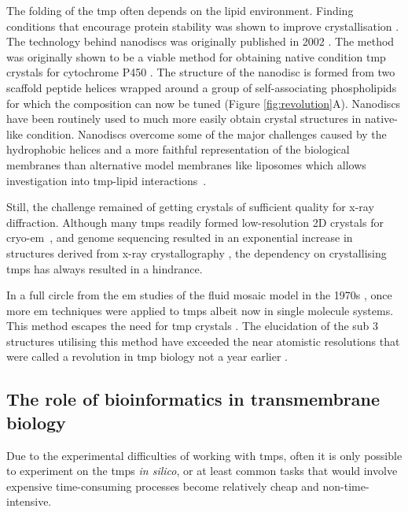 The folding of the \gls{tmp} often depends on the lipid environment.
Finding conditions that encourage protein stability was shown to improve crystallisation \cite{Carpenter2008, Rosenbusch2001}.
The technology behind nanodiscs was originally published in 2002 \cite{Bayburt2002}.
The method was originally shown to be a viable method for obtaining native condition \gls{tmp} crystals for cytochrome P450 \cite{Duan2004}.
The structure of the nanodisc is formed from two scaffold peptide helices wrapped around a group of self\--associating phospholipids for which the composition can now be tuned \cite{Schuler2013} (Figure \ref{fig:revolution}A).
Nanodiscs have been routinely used to much more easily obtain crystal structures in native\--like condition.
Nanodiscs overcome some of the major challenges caused by the hydrophobic helices and a more faithful representation of the biological membranes than alternative model membranes like liposomes which allows investigation into \gls{tmp}\--lipid interactions~\cite{Borch2009}.

Still, the challenge remained of getting crystals of sufficient quality for x\--ray diffraction.
Although many \gls{tmp}s readily formed low\--resolution 2D crystals for cryo\--\gls{em}~\cite{Vinothkumar2015, Raunser2009}, and genome sequencing resulted in an exponential increase in structures derived from x\--ray crystallography \cite{Vinothkumar2010}, the dependency on crystallising \gls{tmp}s has always resulted in a hindrance.

In a full circle from the \gls{em} studies of the fluid mosaic model in the 1970s \cite{Singer1972}, once more \gls{em} techniques were applied to \gls{tmp}s albeit now in single molecule systems.
This method escapes the need for \gls{tmp} crystals \cite{Vinothkumar2015}.
The elucidation of the sub 3\angstrom~ structures utilising this method \cite{Grant2015, Bartesaghi2015} have exceeded the near atomistic resolutions that were called a revolution in \gls{tmp} biology not a year earlier \cite{Kuhlbrandt2014}.


\subsection{The role of bioinformatics in transmembrane biology}

Due to the experimental difficulties of working with \gls{tmp}s, often it is only possible to experiment on the \gls{tmp}s \textit{in silico}, or at least common tasks that would involve expensive time\--consuming processes become relatively cheap and non\--time\--intensive.

